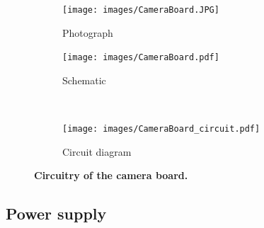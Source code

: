 \documentclass[letterpaper, 11pt]{article}
\begin{document}
\begin{enumerate}[label=\textbf{\arabic*.}]
\begin{figure}[ht]
    \centering
    \begin{subfigure}[b]{0.45\textwidth}
        \centering
        \texttt{[image: images/CameraBoard.JPG]}
        \caption{Photograph}
    \end{subfigure}%
    \begin{subfigure}[b]{0.55\textwidth}
        \centering
        \texttt{[image: images/CameraBoard.pdf]}
        \caption{Schematic}
    \end{subfigure} \\ \vspace{1cm}
    \begin{subfigure}[b]{0.99\textwidth}
        \centering
        \texttt{[image: images/CameraBoard\_circuit.pdf]}
        \caption{Circuit diagram}
    \end{subfigure}
    \caption{\textbf{Circuitry of the camera board.}}
    \label{fig:cameraboard}
\end{figure}

\subsection{Power supply}


\end{enumerate}
\end{document}
